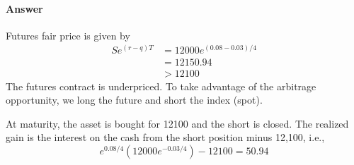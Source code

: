 \paragraph{Answer}
Futures fair price is given by
\begin{align*}
    S e^{(r - q)T} &= 12000 e^{(0.08 - 0.03)/4} \\
                   &= 12150.94 \\
                   &> 12100
\end{align*}
The futures contract is underpriced.
To take advantage of the arbitrage opportunity, we long the future and short
    the index (spot).

At maturity, the asset is bought for 12100 and the short is closed.
The realized gain is the interest on the cash from the short position minus
    12,100, i.e.,
\begin{equation*}
    e^{0.08/4} (12000 e^{-0.03/4}) - 12100 = 50.94
\end{equation*}

